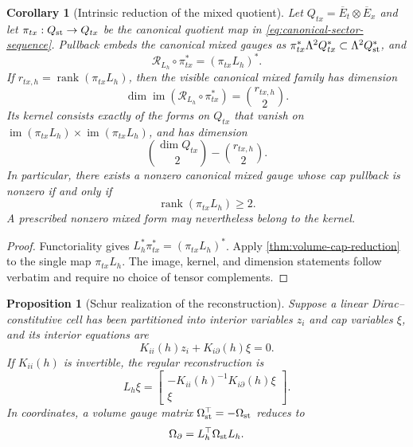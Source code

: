 \documentclass[11pt,a4paper]{article}
\newtheorem{proposition}[theorem]{Proposition}
\newtheorem{corollary}[theorem]{Corollary}
\begin{document}
\begin{corollary}[Intrinsic reduction of the mixed quotient]
\label{cor:mixed-visibility}
Let
\(Q_{tx}=\overline E_t\otimes\overline E_x\) and let
\(\pi_{tx}:Q_{\rm st}\to Q_{tx}\) be the canonical quotient map in
\cref{eq:canonical-sector-sequence}.  Pullback embeds the canonical mixed
gauges as \(\pi_{tx}^*\Lambda^2Q_{tx}^*\subset\Lambda^2Q_{\rm st}^*\), and
\begin{equation}\label{eq:intrinsic-mixed-pullback}
 \boxed{\quad
 \mathcal R_{L_h}\circ\pi_{tx}^*
 =(\pi_{tx}L_h)^*.
 \quad}
\end{equation}
If \(r_{tx,h}=\operatorname{rank}(\pi_{tx}L_h)\), then the visible
canonical mixed family has dimension
\begin{equation}\label{eq:mixed-visibility-dimension}
 \dim\operatorname{im}(\mathcal R_{L_h}\circ\pi_{tx}^*)
 =\binom{r_{tx,h}}2.
\end{equation}
Its kernel consists exactly of the forms on \(Q_{tx}\) that vanish on
\(\operatorname{im}(\pi_{tx}L_h)\times
\operatorname{im}(\pi_{tx}L_h)\), and has dimension
\[
 \binom{\dim Q_{tx}}2-\binom{r_{tx,h}}2.
\]
In particular, there exists a nonzero canonical mixed gauge whose cap
pullback is nonzero if and only if
\begin{equation}\label{eq:mixed-visibility-rank}
 \operatorname{rank}(\pi_{tx}L_h)\ge2.
\end{equation}
A prescribed nonzero mixed form may nevertheless belong to the kernel.
\end{corollary}

\begin{proof}
Functoriality gives
\(L_h^*\pi_{tx}^*=(\pi_{tx}L_h)^*\).  Apply
\cref{thm:volume-cap-reduction} to the single map \(\pi_{tx}L_h\).  The
image, kernel, and dimension statements follow verbatim and require no
choice of tensor complements.
\end{proof}

\begin{proposition}[Schur realization of the reconstruction]
\label{prop:schur-lifting}
Suppose a linear Dirac--constitutive cell has been partitioned into
interior variables \(z_i\) and cap variables \(\xi\), and its interior
equations are
\begin{equation}\label{eq:interior-block-system}
 K_{ii}(h)z_i+K_{i\partial}(h)\xi=0.
\end{equation}
If \(K_{ii}(h)\) is invertible, the regular reconstruction is
\begin{equation}\label{eq:schur-lifting}
 L_h\xi=
 \begin{bmatrix}
  -K_{ii}(h)^{-1}K_{i\partial}(h)\xi\\[1mm]\xi
 \end{bmatrix}.
\end{equation}
In coordinates, a volume gauge matrix \(\Omega_{\rm st}^\top
=-\Omega_{\rm st}\) reduces to
\begin{equation}\label{eq:schur-gauge}
 \Omega_\partial=L_h^\top\Omega_{\rm st}L_h.
\end{equation}
\end{proposition}
\end{document}

